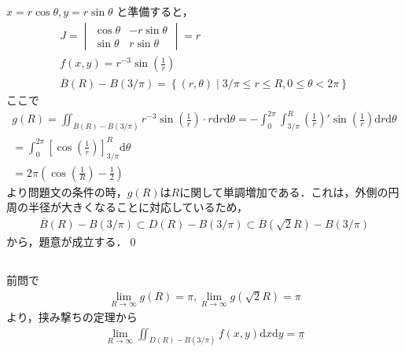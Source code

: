 \documentclass[dvipdfmx]{jsarticle}
\begin{document}
    \subsection{}
      $x = r \cos \theta, y = r \sin \theta$ と準備すると，
      \begin{align*}
        J = 
        \begin{vmatrix}
          \cos \theta & -r\sin \theta \\
          \sin \theta & r \sin \theta
        \end{vmatrix}
        = r\\
        f(x, y) = r ^{-3} \sin \left(\frac{1}{r}\right)\\
        \overline{B}(R) - B(3/\pi) = \left\{(r, \theta) \middle| 3/ \pi \leq r \leq R, 0 \leq \theta < 2\pi\right\}
      \end{align*}  
      ここで
      \begin{align*}
        g(R) = \iint_{\overline{B}(R) - B(3/\pi)} r ^{-3} \sin \left(\frac{1}{r}\right) \cdot r \mathrm{d}r \mathrm{d}\theta
        = -\int_{0}^{2\pi} \int_{3/\pi}^{R} \left(\frac{1}{r}\right)' \sin \left(\frac{1}{r}\right) \mathrm{d}r \mathrm{d}\theta\\
        = \int_{0}^{2\pi} \left[\cos \left(\frac{1}{r}\right)\right]_{3/\pi}^{R}\mathrm{d}\theta\\
        = 2\pi \left(\cos \left(\frac{1}{R}\right) - \frac{1}{2}\right)
      \end{align*}
      より問題文の条件の時，$g(R)$は$R$に関して単調増加である．これは，外側の円周の半径が大きくなることに対応しているため，
      \begin{align*}
        \overline{B}(R) - B(3/\pi) \subset D(R) - B(3/\pi) \subset \overline{B}(\sqrt{2}R) - B(3/\pi)
      \end{align*}
      から，題意が成立する．\qed
    \subsection{}
      前問で
      \begin{align*}
        \lim_{R \to \infty} g(R) = \pi, \lim_{R \to \infty} g(\sqrt{2}R) = \pi
      \end{align*}
      より，挟み撃ちの定理から
      \begin{align*}
        \lim_{R \to \infty} \iint_{D(R) - B(3/\pi)} f(x, y) \mathrm{d}x\mathrm{d}y = \underline{\pi}
      \end{align*}
  \section{}
\end{document}
